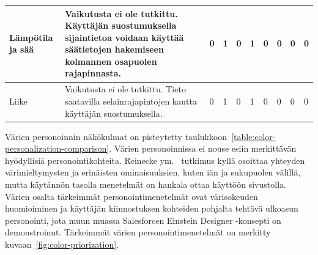\documentclass[finnish, 12pt, a4paper, elec, utf8, a-1b, online]{aaltothesis}
\begin{document}
{\begin{longtable}{p{2.5cm}|p{6cm}|p{0.5cm}p{0.5cm}p{0.5cm}|p{0.5cm}|p{0.5cm}p{0.5cm}p{0.5cm}|p{0.5cm}|}
    \midrule
    Lämpötila ja sää                       & Vaikutusta ei ole tutkittu. Käyttäjän suostumuksella sijaintietoa voidaan käyttää säätietojen hakemiseen kolmannen osapuolen rajapinnasta.                                                                                                                                                                           & 0                                          & 1                                   & 0                                      & 1                            & 0                                               & 0                                         & 0                                         & 0                            \\
    \midrule
    Liike                                  & Vaikutusta ei ole tutkittu. Tieto saatavilla selainrajapintojen kautta käyttäjän suostumuksella.                                                                                                                                                                                                                     & 0                                          & 1                                   & 0                                      & 1                            & 0                                               & 0                                         & 0                                         & 0                            \\
\end{longtable}
}

Värien personoinnin näkökulmat on pisteytetty
taulukkoon~\ref{table:color-personalization-comparison}. Värien personoinnissa
ei nouse esiin merkittävän hyödyllisiä personointikohteita. Reinecke
ym.~\cite{10.1145/2556288.2557052} tutkimus kyllä osoittaa yhteyden
värimieltymysten ja erinäisten ominaisuuksien, kuten iän ja sukupuolen välillä,
mutta käytännön tasolla menetelmät on hankala ottaa käyttöön sivustolla. Värien
osalta tärkeimmät personointimenetelmät ovat värisokeuden huomioiminen ja
käyttäjän kiinnostuksen kohteiden pohjalta tehtävä ulkoasun personointi, jota
muun muassa Salesforcen Einstein Designer -konsepti on demonstroinut. Tärkeimmät
värien personointimenetelmät on merkitty kuvaan~\ref{fig:color-priorization}.
\end{document}
